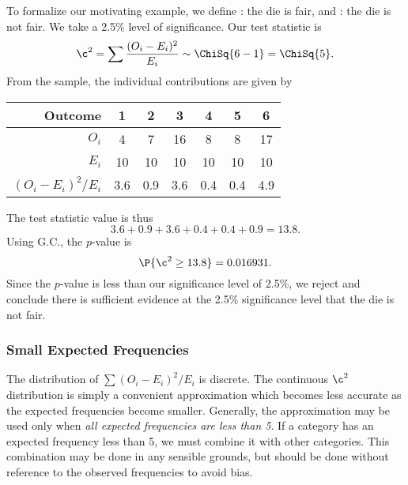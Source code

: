 \begin{example}
    To formalize our motivating example, we define \nullhyp: the die is fair, and \althyp: the die is not fair. We take a 2.5\% level of significance. Our test statistic is \[\c^2 = \sum \frac{(O_i - E_i)^2}{E_i} \sim \ChiSq{6-1} = \ChiSq{5}.\] From the sample, the individual contributions are given by
    \begin{table}[H]
        \centering
        \begin{tabular}{|r|c|c|c|c|c|c|}
        \hline
        Outcome & 1 & 2 & 3 & 4 & 5 & 6 \\ \hline
        $O_i$ & 4 & 7 & 16 & 8 & 8 & 17 \\ \hline
        $E_i$ & 10 & 10 & 10 & 10 & 10 & 10 \\ \hline
        $(O_i-E_i)^2/E_i$ & 3.6 & 0.9 & 3.6 & 0.4 & 0.4 & 4.9 \\ \hline
        \end{tabular}
    \end{table}
    The test statistic value is thus \[3.6 + 0.9 + 3.6 + 0.4 + 0.4 + 0.9 = 13.8.\] Using G.C., the $p$-value is \[\P{\c^2 \geq 13.8} = 0.016931.\] Since the $p$-value is less than our significance level of 2.5\%, we reject \nullhyp{} and conclude there is sufficient evidence at the 2.5\% significance level that the die is not fair.
\end{example}

\subsubsection{Small Expected Frequencies}

The distribution of $\sum (O_i - E_i)^2/E_i$ is discrete. The continuous $\c^2$ distribution is simply a convenient approximation which becomes less accurate as the expected frequencies become smaller. Generally, the approximation may be used only when \emph{all expected frequencies are less than 5}. If a category has an expected frequency less than 5, we must combine it with other categories. This combination may be done in any sensible grounds, but should be done without reference to the observed frequencies to avoid bias.

